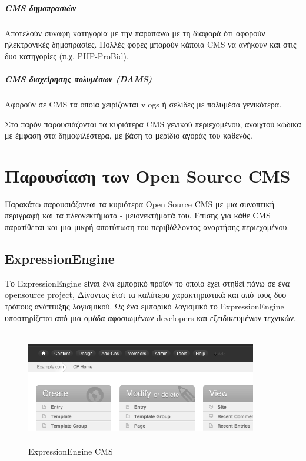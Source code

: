 \documentclass[12pt]{report}
\begin{document}
\paragraph{\textlatin{CMS} δημοπρασιών} Αποτελούν συναφή κατηγορία με την παραπάνω με τη διαφορά ότι αφορούν ηλεκτρονικές δημοπρασίες. Πολλές φορές μπορούν κάποια \textlatin{CMS} να ανήκουν και στις δυο κατηγορίες (π.χ. \textlatin{PHP-ProBid}).

\paragraph{\textlatin{CMS} διαχείρησης πολυμέσων (\textlatin{DAMS})} Αφορούν σε \textlatin{CMS} τα οποία χειρίζονται \textlatin{vlogs} ή σελίδες με πολυμέσα γενικότερα.

Στο παρόν παρουσιάζονται τα κυριότερα \textlatin{CMS} γενικού περιεχομένου, ανοιχτού κώδικα με έμφαση στα δημοφιλέστερα, με βάση το μερίδιο αγοράς του καθενός.

\chapter{Παρουσίαση των \textlatin{Open Source CMS}}\label{ch2}
Παρακάτω παρουσιάζονται τα κυριότερα \textlatin{Open Source CMS} με μια συνοπτική περιγραφή και τα πλεονεκτήματα - μειονεκτήματά του. Επίσης για κάθε \textlatin{CMS} παρατίθεται και μια μικρή αποτύπωση του περιβάλλοντος αναρτήσης περιεχομένου.

\section{\textlatin{ExpressionEngine}}
Το \textlatin{ExpressionEngine} είναι ένα εμπορικό προϊόν το οποίο έχει στηθεί πάνω σε ένα \textlatin{opensource project}, Δίνοντας έτσι τα καλύτερα χαρακτηριστικά και από τους δυο τρόπους ανάπτυξης λογισμικού. Ως ένα εμπορικό λογισμικό το \textlatin{ExpressionEngine} υποστηρίζεται από μια ομάδα αφοσιωμένων \textlatin{developers} και εξειδικευμένων τεχνικών.
\begin{figure}[H]
\centering
\includegraphics[width=0.9\textwidth, height=5cm]{ExpressionEngine-gray}
\caption{\textlatin{ExpressionEngine CMS}}
\label{fig:expr_eng}
\end{figure}
\end{document}
